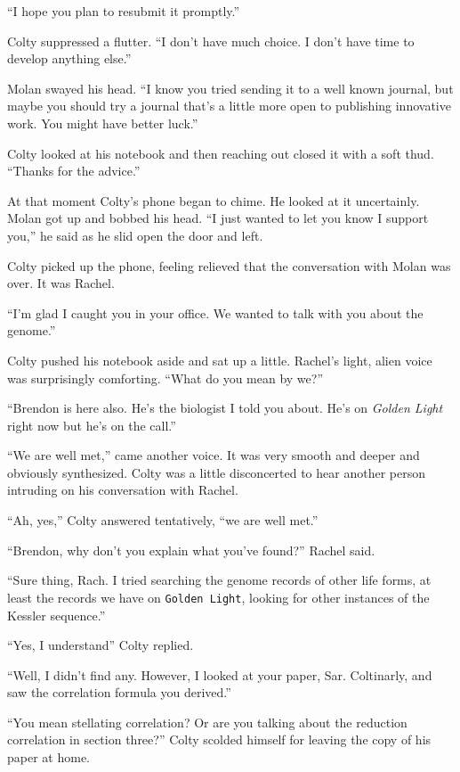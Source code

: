 ``I hope you plan to resubmit it promptly.''

Colty suppressed a flutter. ``I don't have much choice. I don't have time to develop anything
else.''

Molan swayed his head. ``I know you tried sending it to a well known journal, but maybe you
should try a journal that's a little more open to publishing innovative work. You might have
better luck.''

Colty looked at his notebook and then reaching out closed it with a soft thud. ``Thanks for the
advice.''

At that moment Colty's phone began to chime. He looked at it uncertainly. Molan got up and
bobbed his head. ``I just wanted to let you know I support you,'' he said as he slid open the
door and left.

Colty picked up the phone, feeling relieved that the conversation with Molan was over. It was
Rachel.

``I'm glad I caught you in your office. We wanted to talk with you about the genome.''

Colty pushed his notebook aside and sat up a little. Rachel's light, alien voice was
surprisingly comforting. ``What do you mean by we?''

``Brendon is here also. He's the biologist I told you about. He's on \textit{Golden Light} right
now but he's on the call.''

``We are well met,'' came another voice. It was very smooth and deeper and obviously
synthesized. Colty was a little disconcerted to hear another person intruding on his
conversation with Rachel.

``Ah, yes,'' Colty answered tentatively, ``we are well met.''

``Brendon, why don't you explain what you've found?'' Rachel said.

``Sure thing, Rach. I tried searching the genome records of other life forms, at least the
records we have on \texttt{Golden Light}, looking for other instances of the Kessler sequence.''

``Yes, I understand'' Colty replied.

``Well, I didn't find any. However, I looked at your paper, Sar. Coltinarly, and saw the
correlation formula you derived.''

``You mean stellating correlation? Or are you talking about the reduction correlation in section
three?'' Colty scolded himself for leaving the copy of his paper at home.


